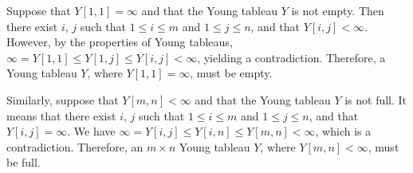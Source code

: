 Suppose that $Y[1,1]=\infty$ and that the Young tableau $Y$ is not empty.
Then there exist $i$, $j$ such that $1\le i\le m$ and $1\le j\le n$, and that $Y[i,j]<\infty$.
However, by the properties of Young tableaus, $\infty=Y[1,1]\le Y[1,j]\le Y[i,j]<\infty$, yielding a contradiction.
Therefore, a Young tableau $Y$, where $Y[1,1]=\infty$, must be empty.

Similarly, suppose that $Y[m,n]<\infty$ and that the Young tableau $Y$ is not full.
It means that there exist $i$, $j$ such that $1\le i\le m$ and $1\le j\le n$, and that $Y[i,j]=\infty$.
We have $\infty=Y[i,j]\le Y[i,n]\le Y[m,n]<\infty$, which is a contradiction.
Therefore, an $m\times n$ Young tableau $Y$, where $Y[m,n]<\infty$, must be full.
